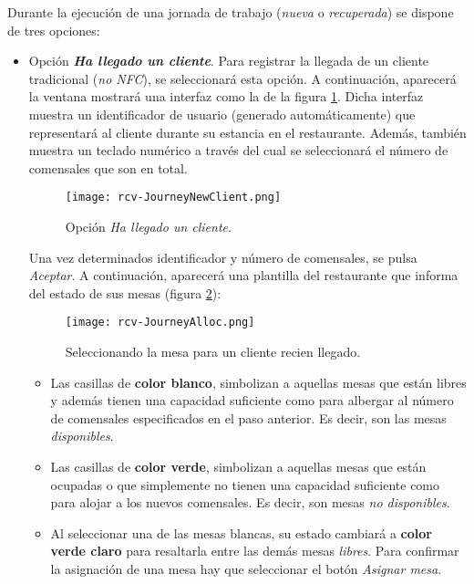 Durante la ejecución de una jornada de trabajo (\emph{nueva} o
\emph{recuperada}) se dispone de tres opciones:
\begin{itemize}
\item Opción \textbf{\emph{Ha llegado un cliente}}. Para registrar la llegada
de un cliente tradicional (\emph{no \acs{NFC}}), se seleccionará esta opción.
A continuación, aparecerá la ventana mostrará una interfaz como la de la 
figura \ref{fig:rcv-JourneyNewClient}. Dicha interfaz muestra un identificador
de usuario (generado automáticamente) que representará al cliente durante su
estancia en el restaurante. Además, también muestra un teclado numérico a
través del cual se seleccionará el número de comensales que son en total.

  \begin{figure}[ht]
    \begin{center}
      \texttt{[image: rcv-JourneyNewClient.png]}
      \caption{Opción \emph{Ha llegado un cliente}.}
      \label{fig:rcv-JourneyNewClient}
    \end{center}
  \end{figure}

Una vez determinados identificador y número de comensales, se pulsa
\emph{Aceptar}. A continuación, aparecerá una plantilla del restaurante que
informa del estado de sus mesas (figura \ref{fig:rcv-JourneyAlloc}):

  \begin{figure}[ht]
    \begin{center}
      \texttt{[image: rcv-JourneyAlloc.png]}
      \caption{Seleccionando la mesa para un cliente recien llegado.}
      \label{fig:rcv-JourneyAlloc}
    \end{center}
  \end{figure}

  \begin{itemize}
  \item Las casillas de \textbf{color blanco}, simbolizan a aquellas mesas que
  están libres y además tienen una capacidad suficiente como para albergar
  al número de comensales especificados en el paso anterior. Es decir, son las
  mesas \emph{disponibles}.
  \item Las casillas de \textbf{color verde}, simbolizan a aquellas mesas que
  están ocupadas o que simplemente no tienen una capacidad suficiente como para
  alojar a los nuevos comensales. Es decir, son mesas \emph{no disponibles}.
  \item Al seleccionar una de las mesas blancas, su estado cambiará a
  \textbf{color verde claro} para resaltarla entre las demás mesas
  \emph{libres}. Para confirmar la asignación de una mesa hay que seleccionar
  el botón \emph{Asignar mesa}.
  \end{itemize}


\end{itemize}
